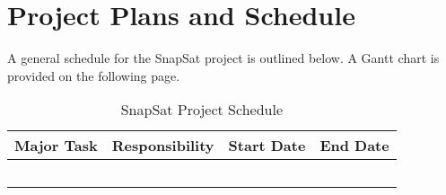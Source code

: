 \section{Project Plans and Schedule}
A general schedule for the SnapSat project is outlined below. A Gantt chart is provided on the following page.
\begin{table}[H]
    \centering
    \caption{SnapSat Project Schedule}
    \vspace{0.15cm}
    \label{tab:designoverview}
    {\renewcommand{\arraystretch}{1.4}%
        \begin{tabular}{|>{\arraybackslash}m{3.5cm}|>{\arraybackslash}m{4cm}|>{\arraybackslash}m{3.2cm}|>{\arraybackslash}m{3.2cm}|}
            \hline
            \textbf{Major Task} & \textbf{Responsibility} & {\bf Start Date} & {\bf End Date} \\ \hline\hline
             & & & \\\hline
             & & & \\\hline
             & & & \\\hline
             & & & \\\hline
             & & & \\\hline
        \end{tabular} } 
    \end{table}
    
